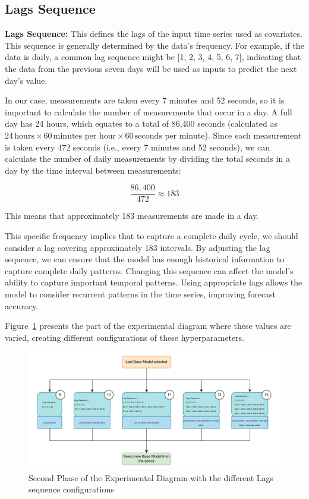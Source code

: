 \subsection{Lags Sequence}

\textbf{Lags Sequence:} This defines the lags of the input time series used as covariates. This sequence is generally determined by the data's frequency. For example, if the data is daily, a common lag sequence might be [1, 2, 3, 4, 5, 6, 7], indicating that the data from the previous seven days will be used as inputs to predict the next day's value.

In our case, measurements are taken every 7 minutes and 52 seconds, so it is important to calculate the number of measurements that occur in a day. A full day has 24 hours, which equates to a total of 86,400 seconds (calculated as \(24 \, \text{hours} \times 60 \, \text{minutes per hour} \times 60 \, \text{seconds per minute}\)). Since each measurement is taken every 472 seconds (i.e., every 7 minutes and 52 seconds), we can calculate the number of daily measurements by dividing the total seconds in a day by the time interval between measurements: 

\[
\frac{86,400}{472} \approx 183
\]

This means that approximately 183 measurements are made in a day.

This specific frequency implies that to capture a complete daily cycle, we should consider a lag covering approximately 183 intervals. By adjusting the lag sequence, we can ensure that the model has enough historical information to capture complete daily patterns. Changing this sequence can affect the model's ability to capture important temporal patterns. Using appropriate lags allows the model to consider recurrent patterns in the time series, improving forecast accuracy.

Figure~\ref{D2} presents the part of the experimental diagram where these values are varied, creating different configurations of these hyperparameters.

\begin{figure}[htbp]
    \centering
    \includegraphics[width=15 cm]{5_ChapterDesign/figuras/Diagrams/D2.pdf}
    \caption{Second Phase of the Experimental Diagram with the different Lags sequence configurations}
    \label{D2}
\end{figure}

